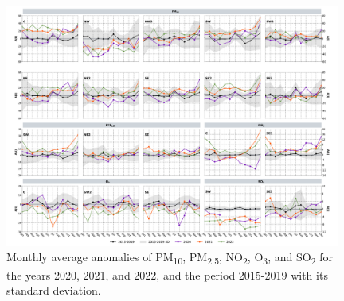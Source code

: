 \documentclass[sn-mathphys-num]{sn-jnl}
\begin{document}
\begin{figure}[H]
	\begin{center}
		\includegraphics[width=0.98\textwidth]{figures/pollutant_anomalies.pdf}
		\caption{Monthly average anomalies of PM\textsubscript{10},
			PM\textsubscript{2.5}, NO\textsubscript{2}, O\textsubscript{3}, and
			SO\textsubscript{2} for the years 2020, 2021, and 2022, and the period
			2015-2019 with its standard deviation.
				{\label{313958}}}
	\end{center}
\end{figure}
\end{document}
